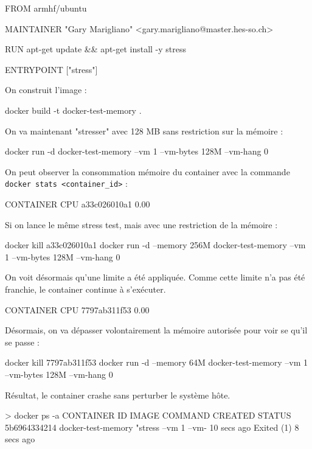 \documentclass[11pt,a4paper,oneside]{report}
\newcommand{\code}[1]{\texttt{#1}}
\begin{document}
\begin{textcode}
FROM armhf/ubuntu

MAINTAINER "Gary Marigliano" <gary.marigliano@master.hes-so.ch>

RUN apt-get update && apt-get install -y stress

ENTRYPOINT ["stress"]
\end{textcode}

On construit l'image :
\begin{bashcode}
docker build -t docker-test-memory .
\end{bashcode}

On va maintenant "stresser" avec 128 MB sans restriction sur la mémoire :
\begin{textcode}
docker run -d docker-test-memory --vm 1 --vm-bytes 128M --vm-hang 0
\end{textcode}

On peut observer la consommation mémoire du container avec la commande \break \code{docker stats <container\_id>} :

\begin{bashcode}
CONTAINER           CPU %
a33c026010a1        0.00%
\end{bashcode}

Si on lance le même stress test, mais avec une restriction de la mémoire :
\begin{textcode}
docker kill a33c026010a1
docker run -d --memory 256M docker-test-memory --vm 1 --vm-bytes 128M --vm-hang 0
\end{textcode}

On voit désormais qu'une limite a été appliquée. Comme cette limite n'a pas été franchie, le container continue à s'exécuter.

\begin{textcode}
CONTAINER           CPU %
7797ab311f53        0.00%
\end{textcode}

Désormais, on va dépasser volontairement la mémoire autorisée pour voir se qu'il se passe :
\begin{textcode}
docker kill 7797ab311f53
docker run -d --memory 64M docker-test-memory --vm 1 --vm-bytes 128M --vm-hang 0
\end{textcode}

Résultat, le container crashe sans perturber le système hôte.
\begin{textcode}
> docker ps -a
CONTAINER ID  IMAGE               COMMAND               CREATED      STATUS
5b6964334214  docker-test-memory  "stress --vm 1 --vm-  10 secs ago  Exited (1) 8 secs ago
\end{textcode}
\end{document}
